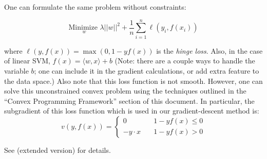 One can formulate the same problem without constraints:

\begin{equation}
\underset{w}{\text{Minimize }} \lambda ||w||^2 + \frac{1}{n}\sum_{i=1}^n \ell(y_i,f(x_i))
\end{equation}


where $\ell(y,f(x)) = \max(0,1-yf(x))$ is the \textit{hinge loss}. Also, in the
case of linear SVM, $f(x) = \langle w, x\rangle + b$ (Note: there are a couple
ways to handle the variable $b$; one can include it in the gradient
calculations, or add extra feature to the data space.) Also note that this loss
function is not smooth. However, one can solve this unconstrained convex problem
using the techniques outlined in the ``Convex Programming Framework'' section of
this document. In particular, the subgradient of this loss function which is
used in our gradient-descent method is:
$$
v(y,f(x)) = \left\{
        \begin{array}{ll}
            0 & \quad 1-yf(x) \leq 0 \\
            -y\cdot x & \quad  1-yf(x) > 0
        \end{array}
    \right.
$$

See \cite{ShSS07} (extended version) for details.



%
%
%


